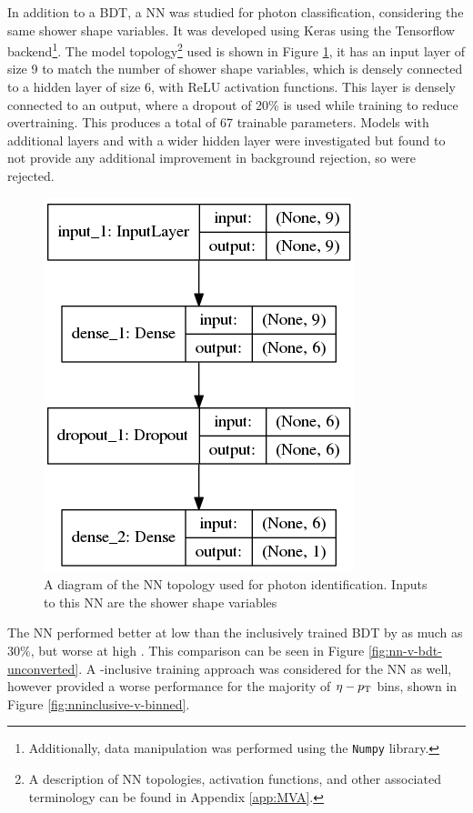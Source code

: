 In addition to a \gls{BDT}, a \gls{NN} was studied for photon classification, considering the same shower shape variables. It was developed using Keras \cite{Keras} using the Tensorflow \cite{Tensorflow} backend\footnote{Additionally, data manipulation was performed using the \texttt{Numpy} \cite{numpy} library.}. The model topology\footnote{A description of \gls{NN} topologies, activation functions, and other associated terminology can be found in Appendix \ref{app:MVA}.} used is shown in Figure \ref{fig:nn-model}, it has an input layer of size 9 to match the number of shower shape variables, which is densely connected to a hidden layer of size 6, with ReLU activation functions. This layer is densely connected to an output, where a dropout \cite{dropout} of 20\% is used while training to reduce overtraining. This produces a total of 67 trainable parameters. Models with additional layers and with a wider hidden layer were investigated but found to not provide any additional improvement in background rejection, so were rejected.

\begin{figure}
    \centering
    \includegraphics[width=.30\textwidth]{chapters/chapter4_photonID/images/model.png}
    \caption[A diagram of the \gls{NN} topology used for photon identification]
    {A diagram of the \gls{NN} topology used for photon identification. Inputs to this \gls{NN} are the shower shape variables}
    \label{fig:nn-model}
\end{figure}

The \gls{NN} performed better at low \pt than the inclusively trained \gls{BDT} by as much as 30\%, but worse at high \pt. This comparison can be seen in Figure \ref{fig:nn-v-bdt-unconverted}. A \pt-inclusive training approach was considered for the \gls{NN} as well, however provided a worse performance for the majority of $\eta-p_{\text{T}}$ bins, shown in Figure \ref{fig:nninclusive-v-binned}.


